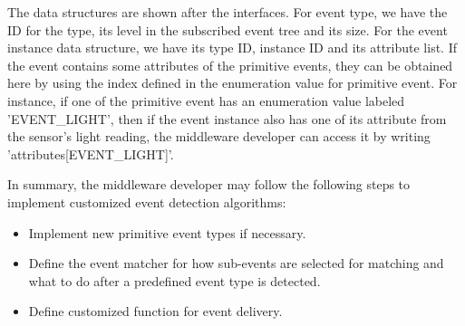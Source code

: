 The data structures are shown after the interfaces. For event type, we have the ID for the type, its level in the subscribed event tree and its size. For the event instance data structure, we have its type ID, instance ID and its attribute list. If the event contains some attributes of the primitive events, they can be obtained here by using the index defined in the enumeration value for primitive event. For instance, if one of the primitive event has an enumeration value labeled 'EVENT\_LIGHT', then if the event instance also has one of its attribute from the sensor's light reading, the middleware developer can access it by writing 'attributes[EVENT\_LIGHT]'.

In summary, the middleware developer may follow the following steps to implement customized event detection algorithms:
\begin{itemize} 
\item Implement new primitive event types if necessary.
\item Define the event matcher for how sub-events are selected for matching and what to do after a predefined event type is detected.
\item Define customized function for event delivery.
\end{itemize}
